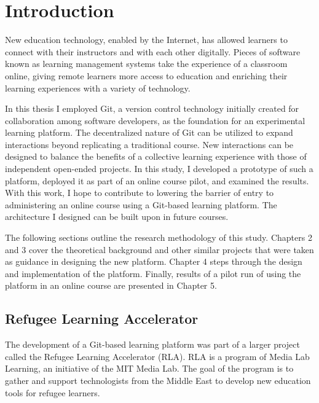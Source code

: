 \documentclass[12pt,twoside]{mitthesis}
\begin{document}
\chapter{Introduction}

New education technology, enabled by the Internet, has allowed learners to connect with their instructors and with each other digitally. Pieces of software known as learning management systems take the experience of a classroom online, giving remote learners more access to education and enriching their learning experiences with a variety of technology.

In this thesis I employed Git, a version control technology initially created for collaboration among software developers, as the foundation for an experimental learning platform. The decentralized nature of Git can be utilized to expand interactions beyond replicating a traditional course. New interactions can be designed to balance the benefits of a collective learning experience with those of independent open-ended projects. In this study, I developed a prototype of such a platform, deployed it as part of an online course pilot, and examined the results. With this work, I hope to contribute to lowering the barrier of entry to administering an online course using a Git-based learning platform. The architecture I designed can be built upon in future courses. 

The following sections outline the research methodology of this study. Chapters 2 and 3 cover the theoretical background and other similar projects that were taken as guidance in designing the new platform. Chapter 4 steps through the design and implementation of the platform. Finally, results of a pilot run of using the platform in an online course are presented in Chapter 5. 

\section{Refugee Learning Accelerator}

The development of a Git-based learning platform was part of a larger project called the Refugee Learning Accelerator (RLA). RLA is a program of Media Lab Learning, an initiative of the MIT Media Lab. The goal of the program is to gather and support technologists from the Middle East to develop new education tools for refugee learners. 
\end{document}
